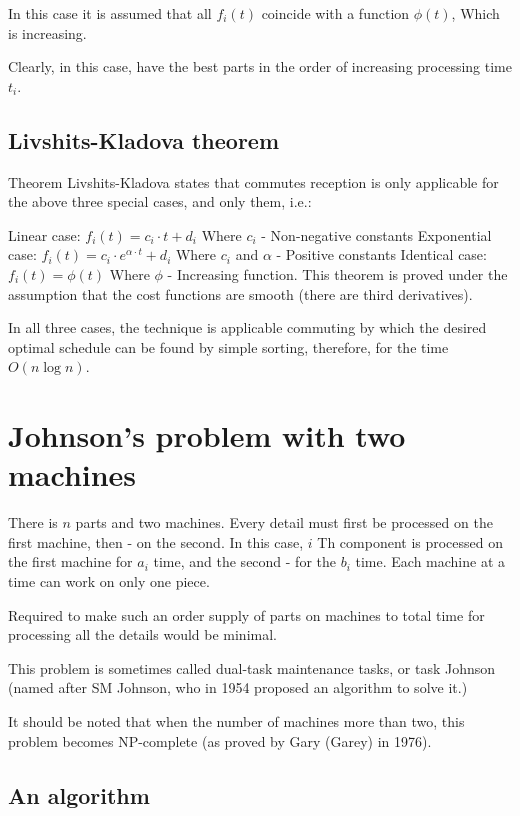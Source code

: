 In this case it is assumed that all $f_i (t)$ coincide with a function $\phi (t)$, Which is increasing.

Clearly, in this case, have the best parts in the order of increasing processing time $t_i$.

\subsection{ Livshits-Kladova theorem }

Theorem Livshits-Kladova states that commutes reception is only applicable for the above three special cases, and only them, i.e.:

Linear case: $f_i (t) = c_i \cdot t + d_i$ Where $c_i$ - Non-negative constants
Exponential case: $f_i (t) = c_i \cdot e ^ {\alpha \cdot t} + d_i$ Where $c_i$ and $\alpha$ - Positive constants
Identical case: $f_i (t) = \phi (t)$ Where $\phi$ - Increasing function.
This theorem is proved under the assumption that the cost functions are smooth (there are third derivatives).

In all three cases, the technique is applicable commuting by which the desired optimal schedule can be found by simple sorting, therefore, for the time $O (n \log n)$.

\section{ Johnson's problem with two machines }
There is $n$ parts and two machines. Every detail must first be processed on the first machine, then - on the second. In this case, $i$ Th component is processed on the first machine for $a_i$ time, and the second - for the $b_i$ time. Each machine at a time can work on only one piece.

Required to make such an order supply of parts on machines to total time for processing all the details would be minimal.

This problem is sometimes called dual-task maintenance tasks, or task Johnson (named after SM Johnson, who in 1954 proposed an algorithm to solve it.)

It should be noted that when the number of machines more than two, this problem becomes NP-complete (as proved by Gary (Garey) in 1976).

\subsection{ An algorithm }

